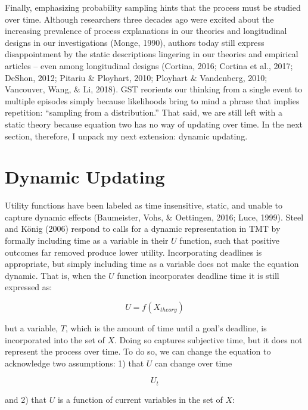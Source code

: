 \documentclass[english,man]{apa6}
\newcounter{author}
\theoremstyle{definition}
\theoremstyle{definition}
\theoremstyle{definition}
\theoremstyle{remark}
\begin{document}
Finally, emphasizing probability sampling hints that the process must be
studied over time. Although researchers three decades ago were excited
about the increasing prevalence of process explanations in our theories
and longitudinal designs in our investigations (Monge, 1990), authors
today still express disappointment by the static descriptions lingering
in our theories and empirical articles -- even among longitudinal
designs (Cortina, 2016; Cortina et al., 2017; DeShon, 2012; Pitariu \&
Ployhart, 2010; Ployhart \& Vandenberg, 2010; Vancouver, Wang, \& Li,
2018). GST reorients our thinking from a single event to multiple
episodes simply because likelihoods bring to mind a phrase that implies
repetition: \enquote{sampling from a distribution.} That said, we are
still left with a static theory because equation two has no way of
updating over time. In the next section, therefore, I unpack my next
extension: dynamic updating.

\section{Dynamic Updating}\label{dynamic-updating}

Utility functions have been labeled as time insensitive, static, and
unable to capture dynamic effects (Baumeister, Vohs, \& Oettingen, 2016;
Luce, 1999). Steel and König (2006) respond to calls for a dynamic
representation in TMT by formally including time as a variable in their
\(U\) function, such that positive outcomes far removed produce lower
utility. Incorporating deadlines is appropriate, but simply including
time as a variable does not make the equation dynamic. That is, when the
\(U\) function incorporates deadline time it is still expressed as:

\begin{equation}
U = f(X_{theory})
\end{equation}

\noindent but a variable, \(T\), which is the amount of time until a
goal's deadline, is incorporated into the set of \(X\). Doing so
captures subjective time, but it does not represent the process over
time. To do so, we can change the equation to acknowledge two
assumptions: 1) that \(U\) can change over time

\begin{equation}
U_{t}
\end{equation}

\noindent and 2) that \(U\) is a function of current variables in the
set of \(X\):
\end{document}
